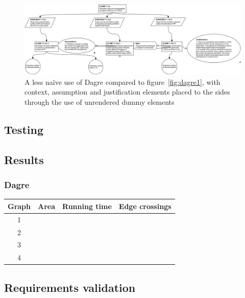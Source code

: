 \begin{figure}
  \centering
  \includegraphics[width=\textwidth]{graphics/results/dagre-enhanced.png}
  \caption{A less na\"ive use of Dagre compared to figure~\ref{fig:dagre1}, with context, assumption and justification elements placed to the sides through the use of unrendered dummy elements}
  \label{fig:dagre2}
\end{figure}



\begin{landscape}

\section{Testing}



\subsection{Results}

\subsubsection{Dagre}

\begin{tabular}{ | c | c | c | c | }
    \hline
    Graph & Area & Running time & Edge crossings \\
    \hline
    1     & & & \\
    \hline
    2     & & & \\
    \hline
    3     & & & \\
    \hline
    4     & & & \\
    \hline
\end{tabular}



\end{landscape}


\subsection{Requirements validation}


